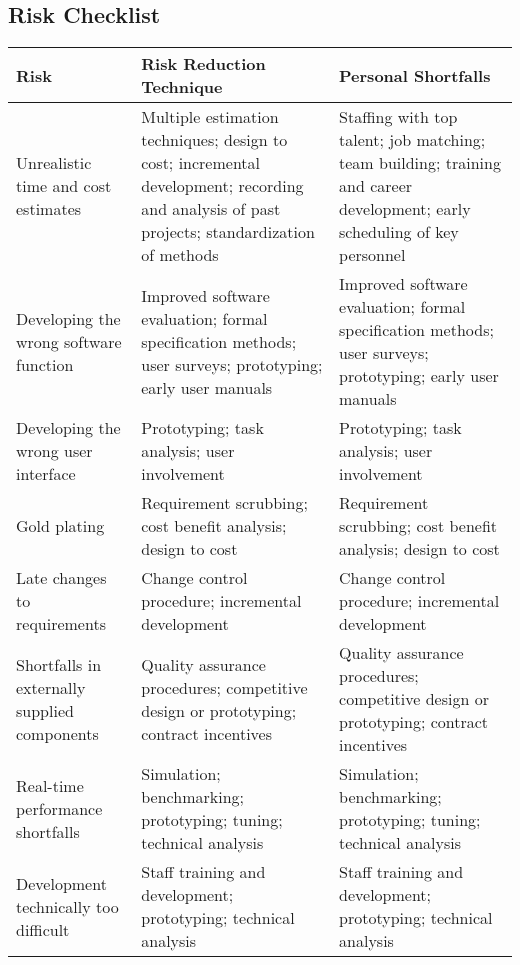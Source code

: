 \documentclass{article}
\begin{document}
\subsection*{Risk Checklist}
\begin{tabularx}{\textwidth}{|X|X|X|}
\hline
\textbf{Risk} & \textbf{Risk Reduction Technique} & \textbf{Personal Shortfalls} \\
\hline
Unrealistic time and cost estimates & Multiple estimation techniques; design to cost; incremental development; recording and analysis of past projects; standardization of methods & Staffing with top talent; job matching; team building; training and career development; early scheduling of key personnel \\
Developing the wrong software function & Improved software evaluation; formal specification methods; user surveys; prototyping; early user manuals & Improved software evaluation; formal specification methods; user surveys; prototyping; early user manuals \\
Developing the wrong user interface & Prototyping; task analysis; user involvement & Prototyping; task analysis; user involvement \\
Gold plating & Requirement scrubbing; cost benefit analysis; design to cost & Requirement scrubbing; cost benefit analysis; design to cost \\
Late changes to requirements & Change control procedure; incremental development & Change control procedure; incremental development \\
Shortfalls in externally supplied components & Quality assurance procedures; competitive design or prototyping; contract incentives & Quality assurance procedures; competitive design or prototyping; contract incentives \\
Real-time performance shortfalls & Simulation; benchmarking; prototyping; tuning; technical analysis & Simulation; benchmarking; prototyping; tuning; technical analysis \\
Development technically too difficult & Staff training and development; prototyping; technical analysis & Staff training and development; prototyping; technical analysis \\
\hline
\end{tabularx}
\end{document}
